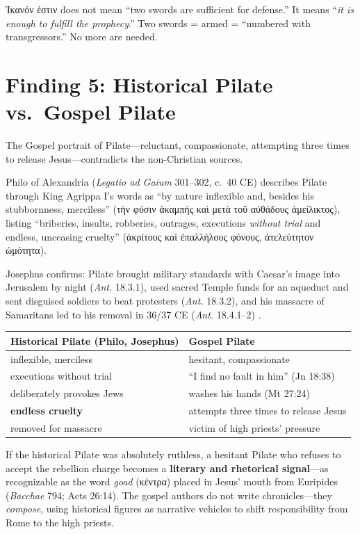 \documentclass[12pt,a4paper]{article}
\begin{document}
Ἱκανόν ἐστιν does not mean ``two swords are sufficient for defense.'' It means ``\textit{it is enough to fulfill the prophecy}.'' Two swords = armed = ``numbered with transgressors.'' No more are needed.

\section{Finding 5: Historical Pilate vs.\ Gospel Pilate}
\label{sec:pilate}

The Gospel portrait of Pilate---reluctant, compassionate, attempting three times to release Jesus---contradicts the non-Christian sources.

Philo of Alexandria (\textit{Legatio ad Gaium} 301--302, c.\ 40 CE) describes Pilate through King Agrippa I's words as ``by nature inflexible and, besides his stubbornness, merciless'' (τὴν φύσιν ἀκαμπής καὶ μετὰ τοῦ αὐθάδους ἀμείλικτος), listing ``briberies, insults, robberies, outrages, executions \textit{without trial} and endless, unceasing cruelty'' (ἀκρίτους καὶ ἐπαλλήλους φόνους, ἀτελεύτητον ὠμότητα).

Josephus confirms: Pilate brought military standards with Caesar's image into Jerusalem by night (\textit{Ant.} 18.3.1), used sacred Temple funds for an aqueduct and sent disguised soldiers to beat protesters (\textit{Ant.} 18.3.2), and his massacre of Samaritans led to his removal in 36/37 CE (\textit{Ant.} 18.4.1--2) \parencite{bond1998}.

\begin{center}
\small
\begin{tabular}{L{6cm}L{6cm}}
\toprule
\textbf{Historical Pilate} (Philo, Josephus) & \textbf{Gospel Pilate} \\
\midrule
inflexible, merciless & hesitant, compassionate \\
executions without trial & ``I find no fault in him'' (Jn 18:38) \\
deliberately provokes Jews & washes his hands (Mt 27:24) \\
\textbf{endless cruelty} & attempts three times to release Jesus \\
removed for massacre & victim of high priests' pressure \\
\bottomrule
\end{tabular}
\end{center}

If the historical Pilate was absolutely ruthless, a hesitant Pilate who refuses to accept the rebellion charge becomes a \textbf{literary and rhetorical signal}---as recognizable as the word \textit{goad} (κέντρα) placed in Jesus' mouth from Euripides (\textit{Bacchae} 794; Acts 26:14). The gospel authors do not write chronicles---they \textit{compose}, using historical figures as narrative vehicles to shift responsibility from Rome to the high priests.
\end{document}
